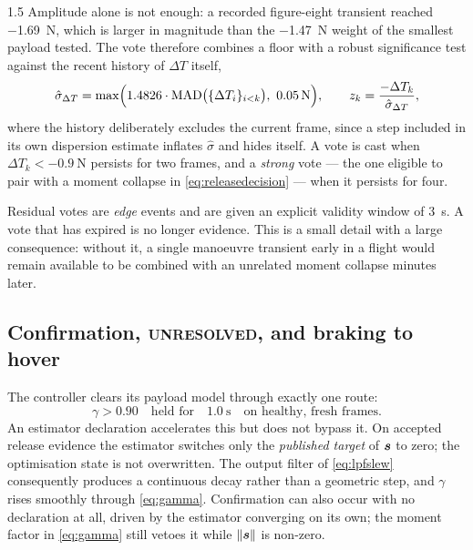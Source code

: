 \begin{spacing}{1.5}
Amplitude alone is not enough: a recorded figure-eight transient reached
\SI{-1.69}{\newton}, which is larger in magnitude than the \SI{-1.47}{\newton}
weight of the smallest payload tested. The vote therefore combines a floor with a
robust significance test against the recent history of $\Delta T$ itself,
\begin{equation}
\hat\sigma_{\Delta T} = \max\Bigl(1.4826\cdot\mathrm{MAD}\bigl(\{\Delta T_i\}_{i<k}\bigr),\ \SI{0.05}{\newton}\Bigr),
\qquad
z_k = \frac{-\Delta T_k}{\hat\sigma_{\Delta T}} ,
\label{eq:deltaTz}
\end{equation}
where the history deliberately excludes the current frame, since a step included
in its own dispersion estimate inflates $\hat\sigma$ and hides itself. A vote is
cast when $\Delta T_k<\SI{-0.9}{\newton}$ persists for two frames, and a
\emph{strong} vote --- the one eligible to pair with a moment collapse in
\eqref{eq:releasedecision} --- when it persists for four.

Residual votes are \emph{edge} events and are given an explicit validity window
of \SI{3}{\second}. A vote that has expired is no longer evidence. This is a
small detail with a large consequence: without it, a single manoeuvre transient
early in a flight would remain available to be combined with an unrelated moment
collapse minutes later.

\subsection{Confirmation, \textsc{unresolved}, and braking to hover}\label{sec:frame:unresolved}

The controller clears its payload model through exactly one route:
\begin{equation}
\gamma > 0.90 \quad\text{held for}\quad \SI{1.0}{\second}
\quad\text{on healthy, fresh frames.}
\label{eq:confirm}
\end{equation}
An estimator declaration accelerates this but does not bypass it. On accepted
release evidence the estimator switches only the \emph{published target} of
$\bm{s}$ to zero; the optimisation state is not overwritten. The output filter of
\eqref{eq:lpfslew} consequently produces a continuous decay rather than a
geometric step, and $\gamma$ rises smoothly through \eqref{eq:gamma}.
Confirmation can also occur with no declaration at all, driven by the estimator
converging on its own; the moment factor in \eqref{eq:gamma} still vetoes it
while $\lVert\bm{s}\rVert$ is non-zero.


\end{spacing}
